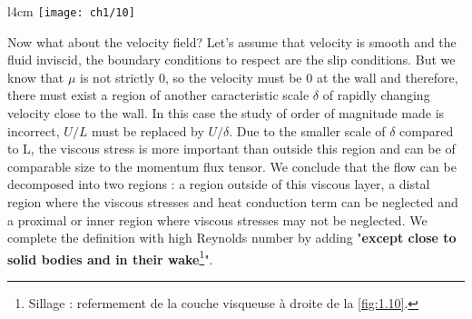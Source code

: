 		\begin{wrapfigure}[8]{l}{4cm}
		\vspace{-5mm}
		\texttt{[image: ch1/10]}
		\label{fig:1.10}
		\end{wrapfigure}
		Now what about the velocity field? Let's assume that velocity is smooth and the fluid inviscid, the boundary conditions to respect are the slip conditions. But we know that $\mu$ is not strictly 0, so the velocity must be 0 at the wall and therefore, there must exist a region of another caracteristic scale $\delta$ of rapidly changing velocity close to the wall. In this case the study of order of magnitude made is incorrect, $U/L$ must be replaced by $U/\delta$. Due to the smaller scale of $\delta$ compared to L, the viscous stress is more important than outside this region and can be of comparable size to the momentum flux tensor.
		 We conclude that the flow can be decomposed into two regions : a region outside of this viscous layer, a distal region where the viscous stresses and heat conduction term can be neglected and a proximal or inner region where viscous stresses may not be neglected. We complete the definition with high Reynolds number by adding "\textbf{except close to solid bodies and in their wake}\footnote{Sillage : refermement de la couche visqueuse à droite de la \autoref{fig:1.10}.}".
		 

